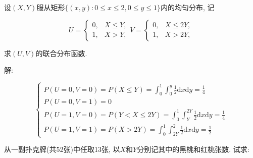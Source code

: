 \documentclass[standard]{ExBook}
\begin{document}
\begin{qitems}
\vspace{-5em}

    \begin{bbox}
    \begin{shaded}
        \qitem
设$(X,Y)$服从矩形$\{(x,y):0\leq x\leq 2, 0\leq y\leq 1\}$内的均匀分布, 记
\vspace{-2em}
\begin{center}
\begin{equation}
    U=
    \left\{
    \begin{array}{cl}
        \nonumber
        0, & X\leq Y,\\
        1, & X>Y,
    \end{array}
    \right.
    V=
    \left\{
    \begin{array}{cl}
        \nonumber
        0, & X\leq 2Y,\\
        1, & X>2Y,
    \end{array}
    \right.
\end{equation}
\end{center}
求$(U,V)$的联合分布函数.
    \end{shaded}
    \end{bbox}

\vspace{-5em}

    \begin{bbox}
解: 
\vspace{-2.6em}
\begin{center}
\begin{equation}
    \left\{
    \begin{array}{ll}
        \nonumber
        P(U=0,V=0)=P(X\leq Y)=\int_{0}^{1}\int_{0}^{y}\frac{1}{2}\mathrm{d}x\mathrm{d}y=\displaystyle\frac{1}{4}\\
        P(U=0,V=1)=0\\
        P(U=1,V=0)=P(Y<X\leq 2Y)=\int_{0}^{1}\int_{Y}^{2Y}\frac{1}{2}\mathrm{d}x\mathrm{d}y=\displaystyle\frac{1}{4}\\
        P(U=1,V=1)=P(X>2Y)=\int_{0}^{1}\int_{2Y}^{2}\frac{1}{2}\mathrm{d}x\mathrm{d}y=\displaystyle\frac{1}{2}
    \end{array}
    \right.
\end{equation}
\end{center}
    \end{bbox}

\vspace{-5em}

    \begin{bbox}
    \begin{shaded}
        \qitem
从一副扑克牌(共52张)中任取13张, 以$X$和$Y$分别记其中的黑桃和红桃张数. 试求:


\end{shaded}
\end{bbox}
\end{qitems}
\end{document}
